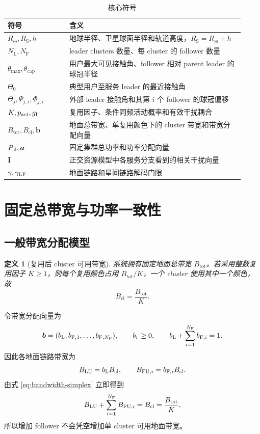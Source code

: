 \documentclass[UTF8,a4paper,11pt]{ctexart}
\newtheorem{definition}{定义}[section]
\newcommand{\NL}{N_{\mathrm L}}
\newcommand{\NF}{N_{\mathrm F}}
\newcommand{\Rearth}{R_{\oplus}}
\newcommand{\Rsat}{R_{\mathrm S}}
\newcommand{\thetam}{\theta_{\max}}
\newcommand{\thetac}{\theta_{\mathrm{cap}}}
\newcommand{\Btot}{B_{\mathrm{tot}}}
\newcommand{\Bcl}{B_{\mathrm{cl}}}
\newcommand{\bvec}{\bm b}
\newcommand{\avec}{\bm a}
\newcommand{\Ivec}{\bm I}
\begin{document}
\begin{table}[htbp]
\centering
\caption{核心符号}
\begin{tabular}{p{0.24\linewidth}p{0.68\linewidth}}
\toprule
符号 & 含义\\
\midrule
$\Rearth,\Rsat,h$ & 地球半径、卫星球面半径和轨道高度，$\Rsat=\Rearth+h$\\
$\NL,\NF$ & leader clusters 数量、每 cluster 的 follower 数量\\
$\thetam,\thetac$ & 用户最大可见接触角、follower 相对 parent leader 的球冠半径\\
$\Theta_0$ & 典型用户至服务 leader 的最近接触角\\
$\Theta_j,\Psi_{j,i},\Phi_{j,i}$ & 外部 leader 接触角和其第 $i$ 个 follower 的球冠偏移\\
$K,p_{\rm act},g_{\rm I}$ & 复用因子、条件同频活动概率和有效干扰耦合\\
$\Btot,\Bcl,\bvec$ & 地面总带宽、单复用颜色下的 cluster 带宽和带宽分配向量\\
$P_{\rm cl},\avec$ & 固定集群总功率和功率分配向量\\
$\Ivec$ & 正交资源模型中各服务分支看到的相关干扰向量\\
$\gamma,\gamma_{\rm LF}$ & 地面链路和星间链路解码门限\\
\bottomrule
\end{tabular}
\end{table}

\section{固定总带宽与功率一致性}

\subsection{一般带宽分配模型}

\begin{definition}[复用后 cluster 可用带宽]
系统拥有固定地面总带宽 $\Btot$。若采用整数复用因子 $K\geq 1$，则每个复用颜色占用
$\Btot/K$，一个 cluster 使用其中一个颜色，故
\begin{equation}
 \Bcl=\frac{\Btot}{K}.
 \label{eq:bcl}
\end{equation}
\end{definition}

令带宽分配向量为
\begin{equation}
 \bvec=(b_{\rm L},b_{{\rm F},1},\ldots,b_{{\rm F},\NF}),
 \qquad b_r\geq 0,
 \qquad b_{\rm L}+\sum_{i=1}^{\NF}b_{{\rm F},i}=1.
 \label{eq:bandwidth-simplex}
\end{equation}
因此各地面链路带宽为
\begin{equation}
 B_{\rm LU}=b_{\rm L}\Bcl,\qquad
 B_{{\rm FU},i}=b_{{\rm F},i}\Bcl.
 \label{eq:branch-bandwidth}
\end{equation}
由式 \eqref{eq:bandwidth-simplex} 立即得到
\begin{equation}
 B_{\rm LU}+\sum_{i=1}^{\NF}B_{{\rm FU},i}
 =\Bcl=\frac{\Btot}{K},
 \label{eq:bandwidth-conservation}
\end{equation}
所以增加 follower 不会凭空增加单 cluster 可用地面带宽。
\end{document}
